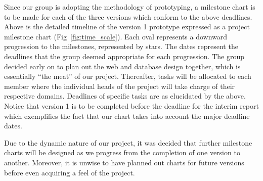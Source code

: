 Since our group is adopting the methodology of prototyping, a milestone chart is to be made for each of the three versions which conform to the above deadlines. Above is the detailed timeline of the version 1 prototype expressed as a project milestone chart (Fig~\ref{fig:time_scale}).
Each oval represents a downward progression to the milestones, represented by stars. The dates represent the deadlines that the group deemed appropriate for each progression. The group decided early on to plan out the web and database design together, which is essentially “the meat” of our project. Thereafter, tasks will be allocated to each member where the individual heads of the project will take charge of their respective domains. Deadlines of specific tasks are as elucidated by the above. Notice that version 1 is to be completed before the deadline for the interim report which exemplifies the fact that our chart takes into account the major deadline dates.

Due to the dynamic nature of our project, it was decided that further milestone charts will be designed as we progress from the completion of one version to another. Moreover, it is unwise to have planned out charts for future versions before even acquiring a feel of the project.
\newpage

 